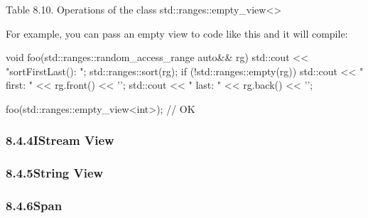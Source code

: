 \begin{center}
Table 8.10. Operations of the class std::ranges::empty\_view<>
\end{center}

For example, you can pass an empty view to code like this and it will compile:

\begin{cpp}
void foo(std::ranges::random_access_range auto&& rg)
{
	std::cout << "sortFirstLast(): \n";
	std::ranges::sort(rg);
	if (!std::ranges::empty(rg)) {
		std::cout << " first: " << rg.front() << '\n';
		std::cout << " last: " << rg.back() << '\n';
	}
}

foo(std::ranges::empty_view<int>{}); // OK
\end{cpp}

\subsubsection*{ 8.4.4\hspace{0.2cm}IStream View}


\subsubsection*{ 8.4.5\hspace{0.2cm}String View}


\subsubsection*{ 8.4.6\hspace{0.2cm}Span}







